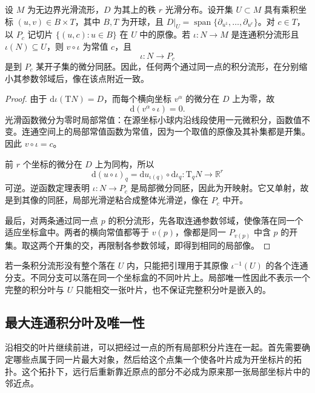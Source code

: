 

\begin{lemma}\label{g1:lem:local-integral-plaque}
	设 \(M\) 为无边界光滑流形，\(D\) 为其上的秩 \(r\) 光滑分布。设开集 \(U\subset M\) 具有乘积坐标 \((u,v)\in B\times T\)，其中 \(B,T\) 为开球，且 \(D|_U=\operatorname{span}\{\partial_{u^1},\ldots,\partial_{u^r}\}\)。对 \(c\in T\)，以 \(P_c\) 记切片 \(\{(u,c):u\in B\}\) 在 \(U\) 中的原像。若 \(\iota:N\to M\) 是连通积分流形且 \(\iota(N)\subseteq U\)，则 \(v\circ\iota\) 为常值 \(c\)，且
	\[
		\iota:N\longrightarrow P_c
	\]
	是到 \(P_c\) 某开子集的微分同胚。因此，任何两个通过同一点的积分流形，在分别缩小其参数邻域后，像在该点附近一致。
\end{lemma}
\begin{proof}
	由于 \(\mathrm{d}\iota(\mathrm{T}N)=D\)，而每个横向坐标 \(v^\alpha\) 的微分在 \(D\) 上为零，故
	\[
		\mathrm{d}(v^\alpha\circ\iota)=0.
	\]
	光滑函数微分为零时局部常值：在源坐标小球内沿线段使用一元微积分，函数值不变。连通空间上的局部常值函数为常值，因为一个取值的原像及其补集都是开集。因此 \(v\circ\iota=c\)。

	前 \(r\) 个坐标的微分在 \(D\) 上为同构，所以
	\[
		\mathrm{d}(u\circ\iota)_q
		=\mathrm{d}u_{\iota(q)}\circ\mathrm{d}\iota_q:\mathrm{T}_qN\to\mathbb R^r
	\]
	可逆。逆函数定理表明 \(\iota:N\to P_c\) 是局部微分同胚，因此为开映射。它又单射，故是到其像的同胚，局部光滑逆粘合成整体光滑逆，像在 \(P_c\) 中开。

	最后，对两条通过同一点 \(p\) 的积分流形，先各取连通参数邻域，使像落在同一个适应坐标盒中。两者的横向常值都等于 \(v(p)\)，像都是同一 \(P_{v(p)}\) 中含 \(p\) 的开集。取这两个开集的交，再限制各参数邻域，即得到相同的局部像。
\end{proof}

若一条积分流形没有整个落在 \(U\) 内，只能把引理用于其原像 \(\iota^{-1}(U)\) 的各个连通分支。不同分支可以落在同一个坐标盒的不同叶片上。局部唯一性因此不表示一个完整的积分叶与 \(U\) 只能相交一张叶片，也不保证完整积分叶是嵌入的。

\subsection{最大连通积分叶及唯一性}
\label{g1:subsec:1304:05}

沿相交的叶片继续前进，可以把经过一点的所有局部积分片连在一起。首先需要确定哪些点属于同一片最大对象，然后给这个点集一个使各叶片成为开坐标片的拓扑。这个拓扑下，远行后重新靠近原点的部分不必成为原来那一张局部坐标片中的邻近点。

